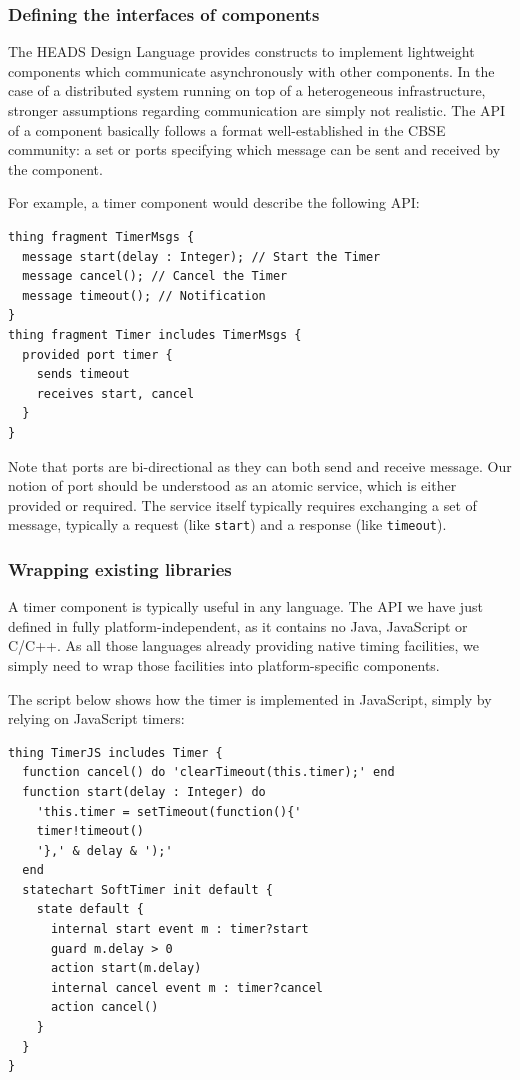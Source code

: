 \subsubsection{Defining the interfaces of components}

The HEADS Design Language provides constructs to implement lightweight components which communicate asynchronously with other components. In the case of a distributed system running on top of a heterogeneous infrastructure, stronger assumptions regarding communication are simply not realistic. The API of a component basically follows a format well-established in the CBSE community: a set or ports specifying which message can be sent and received by the component. 

For example, a timer component would describe the following API: 


\begin{lstlisting}
thing fragment TimerMsgs {  
  message start(delay : Integer); // Start the Timer 
  message cancel(); // Cancel the Timer  
  message timeout(); // Notification 
} 
thing fragment Timer includes TimerMsgs {  
  provided port timer {  
    sends timeout  
    receives start, cancel 
  } 
}
\end{lstlisting}


Note that ports are bi-directional as they can both send and receive message. Our notion of port should be understood as an atomic service, which is either provided or required. The service itself typically requires exchanging a set of message, typically a request (like \texttt{start}) and a response (like \texttt{timeout}). 

\subsubsection{Wrapping existing libraries}
A timer component is typically useful in any language. The API we have just defined in fully platform-independent, as it contains no Java, JavaScript or C/C++. As all those languages already providing native timing facilities, we simply need to wrap those facilities into platform-specific components.  

The script below shows how the timer is implemented in JavaScript, simply by relying on JavaScript timers: 

\begin{lstlisting}
thing TimerJS includes Timer {  
  function cancel() do 'clearTimeout(this.timer);' end  
  function start(delay : Integer) do  
    'this.timer = setTimeout(function(){' 
    timer!timeout()  
    '},' & delay & ');'  
  end  
  statechart SoftTimer init default {  
    state default {  
      internal start event m : timer?start  
      guard m.delay > 0  
      action start(m.delay)  
      internal cancel event m : timer?cancel  
      action cancel()  
    }  
  }  
} 
\end{lstlisting}

